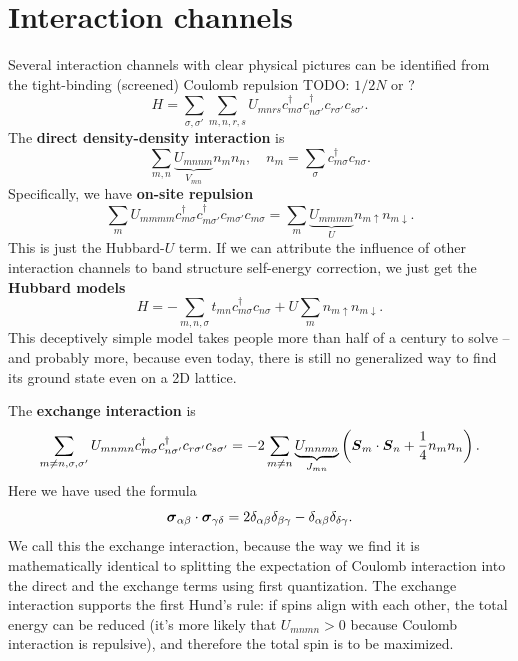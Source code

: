 \documentclass[hyperref, a4paper, 12pt]{report}
\newcommand*{\concept}[1]{{\textbf{#1}}}
\begin{document}
\section{Interaction channels}

Several interaction channels with clear physical pictures 
can be identified from the tight-binding (screened) Coulomb repulsion
TODO: $1/2N$ or ?
\begin{equation}
    H = \sum_{\sigma, \sigma'} \sum_{m, n, r, s} 
    U_{mnrs} c^\dagger_{m \sigma} c^\dagger_{n \sigma'} c_{r \sigma'} c_{s \sigma'}.
\end{equation}
The \concept{direct density-density interaction} is 
\begin{equation}
    \sum_{m, n} \underbrace{U_{mnnm}}_{V_{mn}} n_m n_n, \quad n_m = \sum_\sigma c^\dagger_{m \sigma} c_{n \sigma}.
\end{equation}
Specifically, we have \concept{on-site repulsion}
\begin{equation}
    \sum_{m} U_{mmmm} c^\dagger_{m \sigma} c^\dagger_{m \sigma'} c_{m \sigma'} c_{m \sigma}
    = \sum_{m} \underbrace{U_{mmmm}}_U n_{m \uparrow} n_{m \downarrow}.
\end{equation}
This is just the Hubbard-$U$ term.
If we can attribute the influence of other interaction channels to
band structure self-energy correction,
we just get the \concept{Hubbard models}
\begin{equation}
    H = - \sum_{m, n, \sigma} t_{mn} c^\dagger_{m \sigma} c_{n \sigma}
    + U \sum_m n_{m \uparrow} n_{m \downarrow}.
\end{equation}
This deceptively simple model
takes people more than half of a century to solve 
-- and probably more, 
because even today, 
there is still no generalized way to find its ground state 
even on a 2D lattice.

The \concept{exchange interaction} is 
\begin{equation}
    \sum_{m \neq n, \sigma, \sigma'}
    U_{mnmn} c^\dagger_{m \sigma} c^\dagger_{n \sigma'} c_{r \sigma'} c_{s \sigma'}
    = - 2 \sum_{m \neq n} \underbrace{U_{mnmn}}_{J_{mn}} \left(
        \vb*{S}_m \cdot \vb*{S}_n + \frac{1}{4} n_m n_n
    \right).
\end{equation}
Here we have used the formula 
\begin{equation}
    \vb*{\sigma}_{\alpha \beta} \cdot \vb*{\sigma}_{\gamma \delta}
    = 2 \delta_{\alpha \beta} \delta_{\beta \gamma} - \delta_{\alpha \beta} \delta_{\delta \gamma}.
\end{equation}
We call this the exchange interaction, 
because the way we find it 
is mathematically identical to 
splitting the expectation of Coulomb interaction
into the direct and the exchange terms 
using first quantization.
The exchange interaction supports the first Hund's rule: 
if spins align with each other, 
the total energy can be reduced 
(it's more likely that $U_{mnmn} > 0$ because Coulomb interaction is repulsive),
and therefore the total spin is to be maximized.
\end{document}
